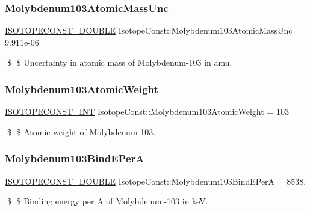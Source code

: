 \subsubsection{\texorpdfstring{Molybdenum103\+Atomic\+Mass\+Unc}{Molybdenum103AtomicMassUnc}}
{\footnotesize\ttfamily \mbox{\hyperlink{group___isotope_const-_macros_ga8f45a7272ce02c0b4c65c44636ed719a}{I\+S\+O\+T\+O\+P\+E\+C\+O\+N\+S\+T\+\_\+\+D\+O\+U\+B\+LE}} Isotope\+Const\+::\+Molybdenum103\+Atomic\+Mass\+Unc = 9.\+911e-\/06}

\$ \$ Uncertainty in atomic mass of Molybdenum-\/103 in amu. \mbox{\label{group___isotope_const-_molybdenum-_mo103_ga04e882489008fbb0ad3352acdc7e8916}} 
\subsubsection{\texorpdfstring{Molybdenum103\+Atomic\+Weight}{Molybdenum103AtomicWeight}}
{\footnotesize\ttfamily \mbox{\hyperlink{group___isotope_const-_macros_ga5f18360b3e99483a35c32d789e62621c}{I\+S\+O\+T\+O\+P\+E\+C\+O\+N\+S\+T\+\_\+\+I\+NT}} Isotope\+Const\+::\+Molybdenum103\+Atomic\+Weight = 103}

\$ \$ Atomic weight of Molybdenum-\/103. \mbox{\label{group___isotope_const-_molybdenum-_mo103_gaacdb5dad1ec7bc745f9ca5ac4adb66b5}} 
\subsubsection{\texorpdfstring{Molybdenum103\+Bind\+E\+PerA}{Molybdenum103BindEPerA}}
{\footnotesize\ttfamily \mbox{\hyperlink{group___isotope_const-_macros_ga8f45a7272ce02c0b4c65c44636ed719a}{I\+S\+O\+T\+O\+P\+E\+C\+O\+N\+S\+T\+\_\+\+D\+O\+U\+B\+LE}} Isotope\+Const\+::\+Molybdenum103\+Bind\+E\+PerA = 8538.}

\$ \$ Binding energy per A of Molybdenum-\/103 in keV. \mbox{\label{group___isotope_const-_molybdenum-_mo103_gaed92af3d2b6f66f7c15deddd97dd6ea6}} 

